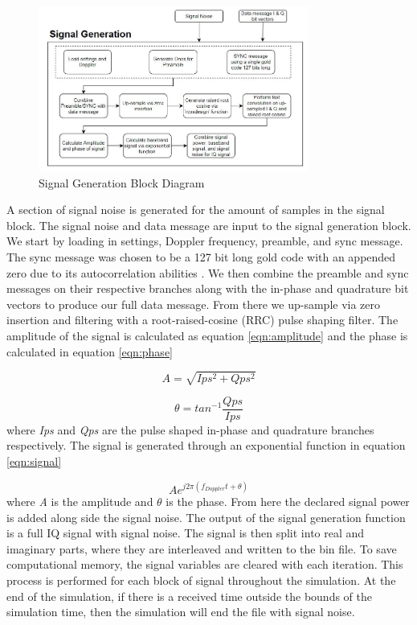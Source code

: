 \documentclass[12pt]{report}
\begin{document}
\begin{figure}[h]
    \centering
    \includegraphics[width=3.5in]{SignalGenBlockDiagram}
    \caption{Signal Generation Block Diagram}
    \label{fig:SigGenBlock}
\end{figure}

A section of signal noise is generated for the amount of samples in the signal block. The signal noise and data message are input to the signal generation block. We start by loading in settings, Doppler frequency, preamble, and sync message. The sync message was chosen to be a 127 bit long gold code with an appended zero due to its autocorrelation abilities \cite{dinanSpreadingCodesDirect1998}.  We then combine the preamble and sync messages on their respective branches along with the in-phase and quadrature bit vectors to produce our full data message. From there we up-sample via zero insertion and filtering with a root-raised-cosine (RRC) pulse shaping filter. The amplitude of the signal is calculated as equation \ref{eqn:amplitude} and the phase is calculated in equation \ref{eqn:phase}

\begin{equation}
    A = \sqrt{Ips^2 + Qps^2}
    \label{eqn:amplitude}
\end{equation}

\begin{equation}
    \theta = tan^{-1} \frac{Qps}{Ips}
    \label{eqn:phase}
\end{equation}
where \textit{Ips} and \textit{Qps} are the pulse shaped in-phase and quadrature branches respectively. The signal is generated through an exponential function in equation \ref{eqn:signal}

\begin{equation}
    A e^{j2\pi (f_{Doppler}t + \theta)}
    \label{eqn:signal}
\end{equation}
where \textit{A} is the amplitude and $\theta$ is the phase. From here the declared signal power is added along side the signal noise. The output of the signal generation function is a full IQ signal with signal noise. The signal is then split into real and imaginary parts, where they are interleaved and written to the bin file. To save computational memory, the signal variables are cleared with each iteration. This process is performed for each block of signal throughout the simulation. At the end of the simulation, if there is a received time outside the bounds of the simulation time, then the simulation will end the file with signal noise.
\end{document}
